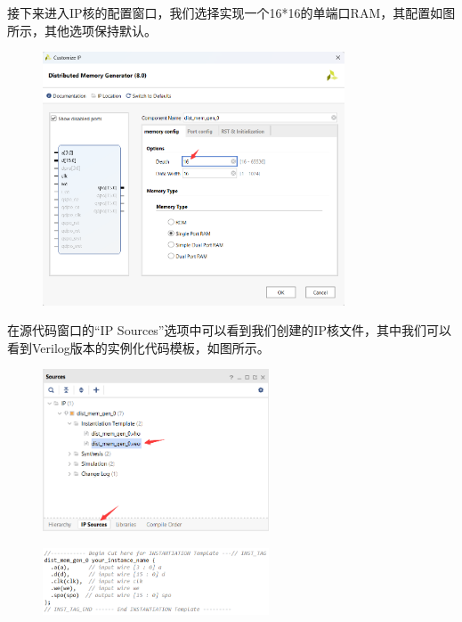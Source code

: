 \documentclass{ctexart}
\begin{document}
接下来进入IP核的配置窗口，我们选择实现一个16*16的单端口RAM，其配置如图所示，其他选项保持默认。

\begin{figure}[H]
    \centering
    \includegraphics[width=0.8\textwidth]{lab3/6.png}
\end{figure}

在源代码窗口的“IP Sources”选项中可以看到我们创建的IP核文件，其中我们可以看到Verilog版本的实例化代码模板，如图所示。

\begin{figure}[H]
    \centering
    \includegraphics[width=0.6\textwidth]{lab3/7.png}
\end{figure}

\begin{figure}[H]
    \centering
    \includegraphics[width=0.6\textwidth]{lab3/8.png}
\end{figure}
\end{document}
